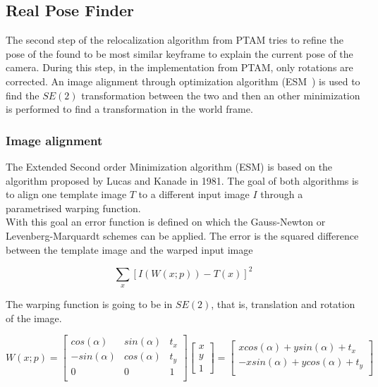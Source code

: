 \subsection{Real Pose Finder}
\label{sub:real_pose_finder}

The second step of the relocalization algorithm from PTAM tries to refine the pose of the found to be most similar keyframe to explain the current pose of the camera. During this step, in the implementation from PTAM, only rotations are corrected. An image alignment through optimization algorithm (ESM~\cite{lovegrove2012parametric}) is used to find the $SE(2)$ transformation between the two and then an other minimization is performed to find a transformation in the world frame.\\

\subsubsection{Image alignment}
\label{ssub:image_alignment}

The Extended Second order Minimization algorithm (ESM) is based on the algorithm proposed by Lucas and Kanade \cite{Baker2004} in 1981. The goal of both algorithms is to align one template image $T$ to a different input image $I$ through a parametrised warping function. \\

With this goal an error function is defined on which the Gauss-Newton or Levenberg-Marquardt schemes can be applied. The error is the squared difference between the template image and the warped input image

\begin{equation}
  \sum_x [I(W(x;p)) - T(x)]^2
\end{equation}

The warping function is going to be in $SE(2)$, that is, translation and rotation of the image.

\begin{equation}
  W(x;p) = 
  \begin{bmatrix}
    cos (\alpha) & sin(\alpha) & t_x\\
    -sin(\alpha) & cos(\alpha) & t_y\\
    0 & 0 & 1 \\
  \end{bmatrix}
  \begin{bmatrix} x \\ y \\ 1 \end{bmatrix}
    =
  \begin{bmatrix}
    xcos(\alpha) + y sin(\alpha) + t_x \\
    -x sin(\alpha) + y cos(\alpha) + t_y \\
  \end{bmatrix}
  \label{eq:se2_warp_function}
\end{equation}

